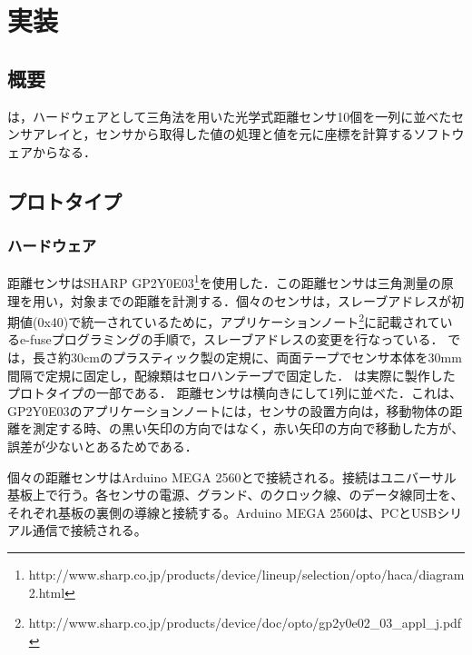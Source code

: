 \chapter{実装}
\section{概要}
\SysName は，ハードウェアとして三角法を用いた光学式距離センサ10個を一列に並べたセンサアレイと，センサから取得した値の処理と値を元に座標を計算するソフトウェアからなる．
\section{プロトタイプ} 
\subsection{ハードウェア}
距離センサはSHARP GP2Y0E03\footnote{http://www.sharp.co.jp/products/device/lineup/selection/opto/haca/diagram2.html}を使用した．この距離センサは三角測量の原理を用い，対象までの距離を計測する．個々のセンサは，スレーブアドレスが初期値(0x40)で統一されているために，アプリケーションノート\footnote{http://www.sharp.co.jp/products/device/doc/opto/gp2y0e02\_03\_appl\_j.pdf}に記載されているe-fuseプログラミングの手順で，スレーブアドレスの変更を行なっている．
\SysName では，長さ約30\si{cm}のプラスティック製の定規に、両面テープでセンサ本体を30\si{mm}間隔で定規に固定し，配線類はセロハンテープで固定した．
は実際に製作したプロトタイプの一部である．
距離センサは横向きにして1列に並べた．これは、GP2Y0E03のアプリケーションノートには，センサの設置方向は，移動物体の距離を測定する時、の黒い矢印の方向ではなく，赤い矢印の方向で移動した方が、誤差が少ないとあるためである．
\par
個々の距離センサはArduino MEGA 2560と\iic で接続される。接続はユニバーサル基板上で行う。各センサの電源、グランド、\iic のクロック線、\iic のデータ線同士を、それぞれ基板の裏側の導線と接続する。Arduino MEGA 2560は、PCとUSBシリアル通信で接続される。




